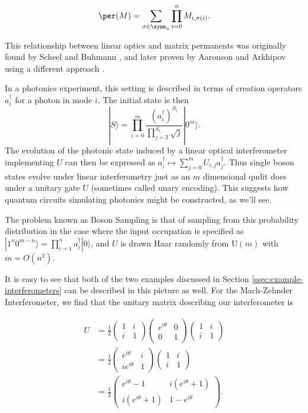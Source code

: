 \begin{equation}
\per(M) = \sum_{\sigma\in\symm_n}\prod_{i=0}^nM_{i,\sigma(i)}.
\label{eqn:permanent}
\end{equation}

This relationship between linear optics and matrix permanents was originally found by Scheel and Buhmann \cite{scheel2008}, and later proven by Aaronson and Arkhipov using a different approach \cite{aaronson2010report, aaronson2011}.

In a photonics experiment, this setting is described in terms of creation operators $a^\dag_i$ for a photon in mode $i$. 
The initial state is then
\begin{equation}
|S\rangle = \prod_{i=0}^m \frac{(a_i^\dagger)^{S_i}}{\prod_{j=2}^{S_i}\sqrt{j}}|0^m\rangle.
\end{equation}
The evolution of the photonic state induced by a linear optical interferometer implementing $U$ can then be expressed as $a_i^\dagger \mapsto \sum_{j = 0}^m U_{i,j}a_j^\dagger$.
Thus single boson states evolve under linear interferometry just as an $m$ dimensional qudit does under a unitary gate $U$ (sometimes called unary encoding).
This suggests how quantum circuits simulating photonics might be constructed, as we'll see.

The problem known as Boson Sampling is that of sampling from this probability distribution in the case where the input occupation is specified as $|1^n 0^{m - n}\rangle = \prod_{i = 1}^n a_{i}^\dagger|0\rangle$, and $U$ is drawn Haar randomly from U$(m)$ with $m=O(n^2)$\cite{aaronson2010report, aaronson2011}.

It is easy to see that both of the two examples discussed in Section \ref{ssec:example-interferometers} can be described in this picture as well. For the Mach-Zehnder Interferometer, we find that the unitary matrix describing our interferometer is

\begin{align}
U &= \frac{1}{2}\begin{pmatrix}1&i\\i&1\end{pmatrix}\begin{pmatrix}e^{i\theta}&0\\0&1\end{pmatrix}\begin{pmatrix}1&i\\i&1\end{pmatrix}\\
&= \frac{1}{2}\begin{pmatrix}e^{i\theta}&i\\ie^{i\theta}&1\end{pmatrix}\begin{pmatrix}1&i\\i&1\end{pmatrix}\\
&= \frac{1}{2}\begin{pmatrix}e^{i\theta}-1&i(e^{i\theta}+1)\\i(e^{i\theta}+1)&1-e^{i\theta}\end{pmatrix}.
\end{align}

